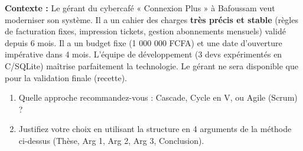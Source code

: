 \documentclass[11pt]{article}
\begin{document}
\begin{exercice}
\textbf{Contexte :} Le gérant du cybercafé « Connexion Plus » à Bafoussam veut moderniser son système. Il a un cahier des charges \textbf{très précis et stable} (règles de facturation fixes, impression tickets, gestion abonnements mensuels) validé depuis 6 mois. Il a un budget fixe (1 000 000 FCFA) et une date d'ouverture impérative dans 4 mois. L'équipe de développement (3 devs expérimentés en C/SQLite) maîtrise parfaitement la technologie. Le gérant ne sera disponible que pour la validation finale (recette).
\begin{enumerate}
    \item Quelle approche recommandez-vous : Cascade, Cycle en V, ou Agile (Scrum) ?
    \item Justifiez votre choix en utilisant la structure en 4 arguments de la méthode ci-dessus (Thèse, Arg 1, Arg 2, Arg 3, Conclusion).
\end{enumerate}
\end{exercice}
\end{document}
